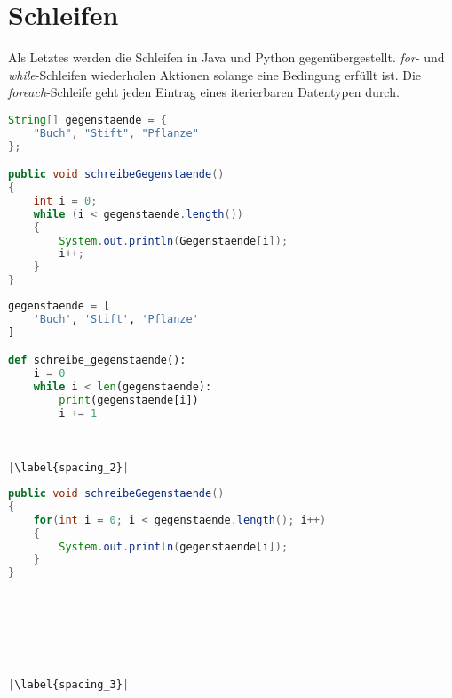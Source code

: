 \section{Schleifen}
Als Letztes werden die Schleifen in Java und Python gegenübergestellt. \textit{for}- und \textit{while}-Schleifen wiederholen Aktionen solange eine Bedingung erfüllt ist. Die \textit{foreach}-Schleife geht jeden Eintrag eines iterierbaren Datentypen durch.

\begin{minipage}{.5\linewidth}
\begin{lstlisting}[language=java,caption={while-Schleife Java},captionpos=b,label={lst:java:while},frame=none]
String[] gegenstaende = {
    "Buch", "Stift", "Pflanze"
};

public void schreibeGegenstaende()
{
    int i = 0;
    while (i < gegenstaende.length())
    {
        System.out.println(Gegenstaende[i]);
        i++;
    }
}
\end{lstlisting}
\end{minipage}
\begin{minipage}{.5\linewidth}
\begin{lstlisting}[language=python,caption={while-Schleife Python},captionpos=b,label={lst:python:while},frame=l,escapechar=|]
gegenstaende = [
    'Buch', 'Stift', 'Pflanze'
]

def schreibe_gegenstaende():
    i = 0
    while i < len(gegenstaende):
        print(gegenstaende[i])
        i += 1
        
        

|\label{spacing_2}|
\end{lstlisting}
\end{minipage}

\begin{minipage}{.5\linewidth}
\begin{lstlisting}[language=java,caption={for-Schleife Java},captionpos=b,label={lst:java:for},frame=none]
public void schreibeGegenstaende()
{
    for(int i = 0; i < gegenstaende.length(); i++)
    {
        System.out.println(gegenstaende[i]);
    }
}
\end{lstlisting}
\end{minipage}
\begin{minipage}{.5\linewidth}
\begin{lstlisting}[language=python,captionpos=b,label={lst:python:for},frame=l,escapechar=|]



        
        

|\label{spacing_3}|
\end{lstlisting}
\end{minipage}

